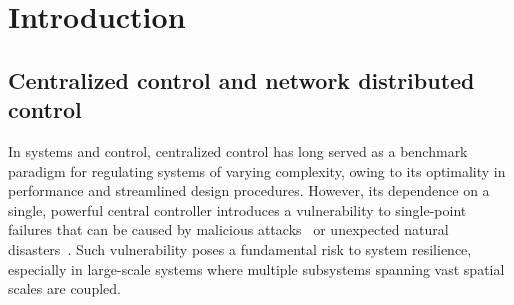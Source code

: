 \chapter{Introduction}
\label{intro_chapter}











\section{Centralized control and network distributed control}
In systems and control, centralized control has long served as a benchmark paradigm for regulating systems of varying complexity, owing to its optimality in performance and streamlined design procedures. However, its dependence on a single, powerful central controller introduces a vulnerability to single-point failures that can be caused by malicious attacks~\cite{Ukraine2021CyberAttack} or unexpected natural disasters~\cite{Joshua2021TexasStorm}. Such vulnerability poses a fundamental risk to system resilience, especially in large-scale systems where multiple subsystems spanning vast spatial scales are coupled.

